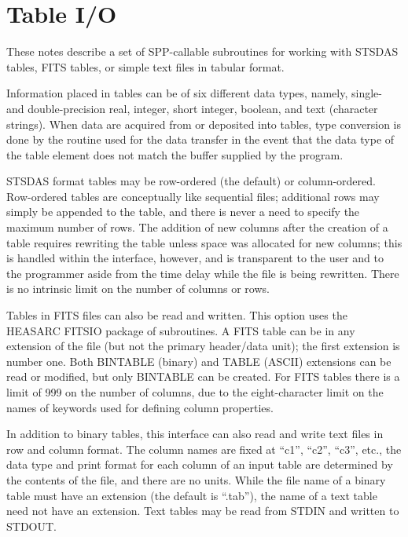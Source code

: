 

\section{Table I/O} \label{tab-sec}

These notes describe a set of SPP-callable subroutines for working
with STSDAS tables, FITS tables, or simple text files in tabular format.

Information placed in tables can be of six different data types,
namely, single- and double-precision real, integer, short integer,
boolean, and text (character strings).
When data are acquired from or deposited into tables,
type conversion is done by the routine used for the data transfer in
the event that the data type of the table element does not match the buffer
supplied by the program.

STSDAS format tables may be row-ordered (the default) or column-ordered.
Row-ordered tables are conceptually like sequential files;
additional rows may simply be appended to the table,
and there is never a need to specify the maximum number of rows.
The addition of new columns after the creation of a table
requires rewriting the table unless
space was allocated for new columns;
this is handled within the interface, however,
and is transparent to the user and to the programmer
aside from the time delay while the file is being rewritten.
There is no intrinsic limit on the number of columns or rows.

Tables in FITS files can also be read and written.
This option uses the HEASARC FITSIO package of subroutines.
A FITS table can be in any extension of the file
(but not the primary header/data unit);
the first extension is number one.
Both BINTABLE (binary) and TABLE (ASCII) extensions
can be read or modified,
but only BINTABLE can be created.
For FITS tables there is a limit of 999 on the number of columns,
due to the eight-character limit on the names of keywords
used for defining column properties.

In addition to binary tables,
this interface can also read and write text files in row and column format.
The column names are fixed at ``c1'', ``c2'', ``c3'', etc.,
the data type and print format for each column of an input table
are determined by the contents of the file,
and there are no units.
While the file name of a binary table must have an extension
(the default is ``.tab''),
the name of a text table need not have an extension.
Text tables may be read from STDIN and written to STDOUT.

